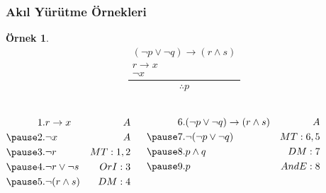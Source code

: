 \documentclass[dvipsnames]{beamer}
\theoremstyle{definition}
\theoremstyle{example}
\newtheorem{ornek}[theorem]{Örnek}
\theoremstyle{plain}
\begin{document}
\begin{frame}
  \frametitle{Akıl Yürütme Örnekleri}

  \begin{ornek}
    \[
    \frac
      {
        \begin{array}{c}
          (\neg p \vee \neg q) \rightarrow (r \wedge s)\\
          r \rightarrow x\\
          \neg x
        \end{array}
      }
      {
        \therefore p
      }
    \]

    \pause
    \begin{columns}[t]
      \begin{eqnarray*}
        1. & r \rightarrow x                               & A\\
        \pause
        2. & \neg x                                        & A\\
        \pause
        3. & \neg r                                        & MT:1,2\\
        \pause
        4. & \neg r \vee \neg s                            & OrI:3\\
        \pause
        5. & \neg (r \wedge s)                             & DM:4
      \end{eqnarray*}

      \pause
      \begin{eqnarray*}
        6. & (\neg p \vee \neg q) \rightarrow (r \wedge s) & A\\
        \pause
        7. & \neg (\neg p \vee \neg q)                     & MT:6,5\\
        \pause
        8. & p \wedge q                                    & DM:7\\
        \pause
        9. & p                                             & AndE:8
      \end{eqnarray*}
    \end{columns}
  \end{ornek}
\end{frame}
\end{document}
